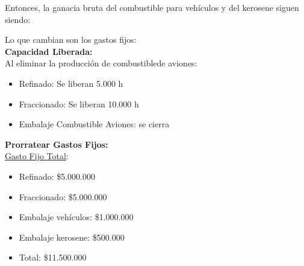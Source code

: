 \documentclass[10pt,a4paper]{article}
\begin{document}
\begin{enumerate}
\begin{itemize}
    \end{itemize}

    Entonces, la ganacia bruta del combustible para vehículos y del kerosene siguen siendo: \\

    \begin{center}
    \end{center}

    \vspace{0.5em}

    Lo que cambian son los gastos fijos: \\

    \textbf{Capacidad Liberada:} \\

    Al eliminar la producción de combustiblede aviones:

    \begin{itemize}

        \item Refinado: Se liberan 5.000 h
        \item Fraccionado: Se liberan 10.000 h
        \item Embalaje Combustible Aviones: se cierra

    \end{itemize}

    \vspace{0.5em}

    \textbf{Prorratear Gastos Fijos:} \\

    \underline{Gasto Fijo Total}:

    \begin{itemize}

        \item Refinado: \$5.000.000
        \item Fraccionado: \$5.000.000
        \item Embalaje vehículos: \$1.000.000
        \item Embalaje kerosene: \$500.000 \\
        \item Total: \$11.500.000 \\


\end{itemize}
\end{enumerate}
\end{document}
